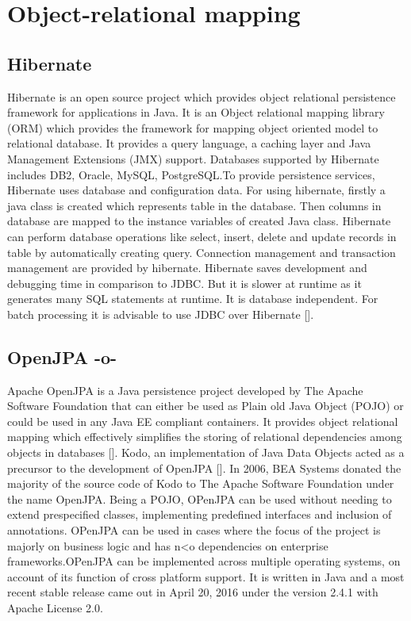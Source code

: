 \section{Object-relational mapping}

\subsection{Hibernate}

Hibernate is an open source project which provides object relational
persistence framework for applications in Java. It is an Object
relational mapping library (ORM) which provides the framework for
mapping object oriented model to relational database. It provides a
query language, a caching layer and Java Management Extensions (JMX)
support. Databases supported by Hibernate includes DB2, Oracle, MySQL,
PostgreSQL.To provide persistence services, Hibernate uses database
and configuration data. For using hibernate, firstly a java class is
created which represents table in the database. Then columns in
database are mapped to the instance variables of created Java
class. Hibernate can perform database operations like select, insert,
delete and update records in table by automatically creating
query. Connection management and transaction management are provided
by hibernate.  Hibernate saves development and debugging time in
comparison to JDBC.  But it is slower at runtime as it generates many
SQL statements at runtime. It is database independent. For batch
processing it is advisable to use JDBC over
Hibernate [\cite{www-hibernate}].

\subsection{OpenJPA -o-}

Apache OpenJPA is a Java persistence project developed by The Apache
Software Foundation that can either be used as Plain old Java Object
(POJO) or could be used in any Java EE compliant containers. It
provides object relational mapping which effectively simplifies the
storing of relational dependencies among objects in
databases [\cite{www-openjpa}].  Kodo, an implementation of Java Data
Objects acted as a precursor to the development of
OpenJPA [\cite{www-openjpa-wiki}]. In 2006, BEA Systems donated the
majority of the source code of Kodo to The Apache Software Foundation
under the name OpenJPA. Being a POJO, OPenJPA can be used without
needing to extend prespecified classes, implementing predefined
interfaces and inclusion of annotations. OPenJPA can be used in cases
where the focus of the project is majorly on business logic and has
n<o dependencies on enterprise frameworks.OPenJPA can be implemented
across multiple operating systems, on account of its function of cross
platform support. It is written in Java and a most recent stable
release came out in April 20, 2016 under the version 2.4.1 with Apache
License 2.0.



